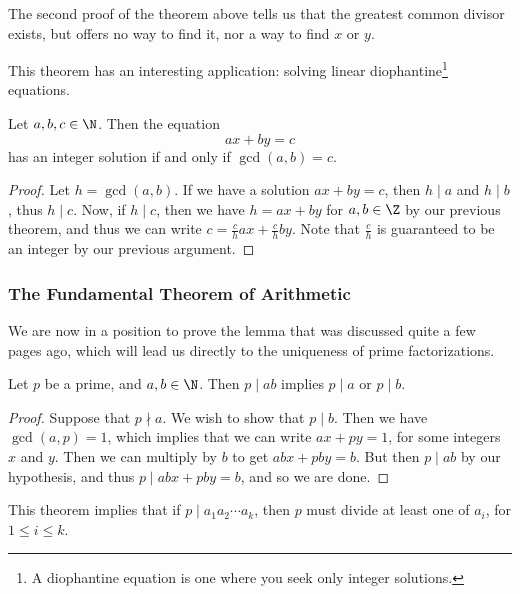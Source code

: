 \begin{remark}
	The second proof of the theorem above tells us that the greatest common divisor exists, but offers no way to find it, nor a way to find $x$ or $y$. 
\end{remark}

This theorem has an interesting application: solving linear diophantine\footnote{A diophantine equation is one where you seek only integer solutions.} equations. 

\begin{corollary}
	Let $a, b, c \in \N$. Then the equation
	$$
	ax + by = c
	$$
	has an integer solution if and only if $\gcd(a, b) = c$.
\end{corollary}
\begin{proof}
	Let $h = \gcd(a, b)$. If we have a solution $ax + by = c$, then $h \mid a$ and $h \mid b$, thus $h \mid c$. Now, if $h \mid c$, then we have $h = ax + by$ for $a, b \in \Z$ by our previous theorem, and thus we can write $c = \frac{c}{h}ax + \frac{c}{h}by$. Note that $\frac{c}{h}$ is guaranteed to be an integer by our previous argument.
\end{proof}

\subsubsection{The Fundamental Theorem of Arithmetic}

We are now in a position to prove the lemma that was discussed quite a few pages ago, which will lead us directly to the uniqueness of prime factorizations.

\begin{theorem}
	Let $p$ be a prime, and $a, b \in \N$. Then $p \mid ab$ implies $p \mid a$ or $p \mid b$.
\end{theorem}
\begin{proof}
	Suppose that $p \nmid a$. We wish to show that $p \mid b$. Then we have $\gcd(a, p) = 1$, which implies that we can write $ax + py = 1$, for some integers $x$ and $y$. Then we can multiply by $b$ to get $abx + pby = b$. But then $p \mid ab$ by our hypothesis, and thus $p \mid abx + pby = b$, and so we are done.
\end{proof}

\begin{remark}
	This theorem implies that if $p \mid a_1 a_2 \cdots a_k$, then $p$ must divide at least one of $a_i$, for $1 \leq i \leq k$.
\end{remark}

